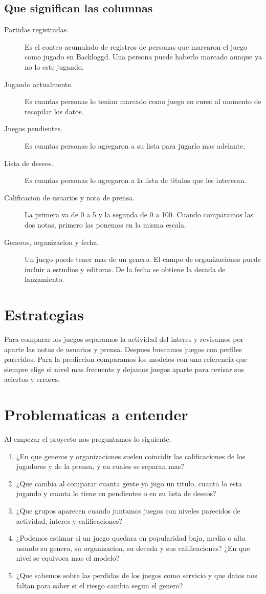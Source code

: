\documentclass[letterpaper,11pt]{article}
\begin{document}
\subsection{Que significan las columnas}
\begin{description}
\item[Partidas registradas.] Es el conteo acumulado de registros de personas que marcaron el juego como jugado en Backloggd. Una persona puede haberlo marcado aunque ya no lo este jugando.
\item[Jugando actualmente.] Es cuantas personas lo tenian marcado como juego en curso al momento de recopilar los datos.
\item[Juegos pendientes.] Es cuantas personas lo agregaron a su lista para jugarlo mas adelante.
\item[Lista de deseos.] Es cuantas personas lo agregaron a la lista de titulos que les interesan.
\item[Calificacion de usuarios y nota de prensa.] La primera va de 0 a 5 y la segunda de 0 a 100. Cuando comparamos las dos notas, primero las ponemos en la misma escala.
\item[Generos, organizacion y fecha.] Un juego puede tener mas de un genero. El campo de organizaciones puede incluir a estudios y editoras. De la fecha se obtiene la decada de lanzamiento.
\end{description}

\section{Estrategias}
Para comparar los juegos separamos la actividad del interes y revisamos por aparte las notas de usuarios y prensa. Despues buscamos juegos con perfiles parecidos. Para la prediccion comparamos los modelos con una referencia que siempre elige el nivel mas frecuente y dejamos juegos aparte para revisar sus aciertos y errores.

\section{Problematicas a entender}
Al empezar el proyecto nos preguntamos lo siguiente.

\begin{enumerate}
\item ¿En que generos y organizaciones suelen coincidir las calificaciones de los jugadores y de la prensa, y en cuales se separan mas?
\item ¿Que cambia al comparar cuanta gente ya jugo un titulo, cuanta lo esta jugando y cuanta lo tiene en pendientes o en su lista de deseos?
\item ¿Que grupos aparecen cuando juntamos juegos con niveles parecidos de actividad, interes y calificaciones?
\item ¿Podemos estimar si un juego quedara en popularidad baja, media o alta usando su genero, su organizacion, su decada y sus calificaciones? ¿En que nivel se equivoca mas el modelo?
\item ¿Que sabemos sobre las perdidas de los juegos como servicio y que datos nos faltan para saber si el riesgo cambia segun el genero?
\end{enumerate}
\end{document}
